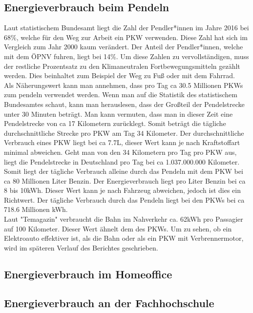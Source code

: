 \documentclass[a4paper,12pt]{scrartcl}
\begin{document}
\subsection{Energieverbrauch beim Pendeln}
Laut statistischem Bundesamt liegt die Zahl der Pendler*innen im Jahre 2016 bei 68\%, welche für den Weg zur Arbeit ein PKW verwenden. Diese Zahl hat sich im Vergleich zum Jahr 2000 kaum verändert. Der Anteil der Pendler*innen, welche mit dem ÖPNV fuhren, liegt bei 14\%. Um diese Zahlen zu vervollständigen, muss der restliche Prozentsatz zu den Klimaneutralen Fortbewegungsmitteln gezählt werden. Dies beinhaltet zum Beispiel der Weg zu Fuß oder mit dem Fahrrad.\\
Als Näherungswert kann man annehmen, dass pro Tag ca 30.5 Millionen PKWs zum pendeln verwendet werden. Wenn man auf die Statistik des statistischem Bundesamtes schaut, kann man herauslesen, dass der Großteil der Pendelstrecke unter 30 Minuten beträgt. Man kann vermuten, dass man in dieser Zeit eine Pendelstrecke von ca 17 Kilometern zurücklegt. Somit beträgt die tägliche durchschnittliche Strecke pro PKW am Tag 34 Kilometer. Der durchschnittliche Verbrauch eines PKW liegt bei ca 7.7L, dieser Wert kann je nach Kraftstoffart minimal abweichen. Geht man von den 34 Kilometern pro Tag pro PKW aus, liegt die Pendelstrecke in Deutschland pro Tag bei ca 1.037.000.000 Kilometer. Somit liegt der tägliche Verbrauch alleine durch das Pendeln mit dem PKW bei ca 80 Millionen Liter Benzin.
Der Energieverbrauch liegt pro Liter Benzin bei ca 8 bis 10kWh. Dieser Wert kann je nach Fahrzeug abweichen, jedoch ist dies ein Richtwert. Der tägliche Verbrauch durch das Pendeln liegt bei den PKWs bei ca 718.6 Millionen kWh.\\
Laut "Temagazin" verbraucht die Bahn im Nahverkehr ca. 62kWh pro Passagier auf 100 Kilometer. Dieser Wert ähnelt dem des PKWs. Um zu sehen, ob ein Elektroauto effektiver ist, als die Bahn oder als ein PKW mit Verbrennermotor, wird im späteren Verlauf des Berichtes geschrieben.


\subsection{Energieverbrauch im Homeoffice}
\subsection{Energieverbrauch an der Fachhochschule}
\end{document}
